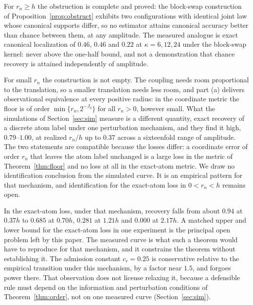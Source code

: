 \documentclass[11pt]{article}
\theoremstyle{definition}
\newcommand{\1}{\mathbf 1}\newcommand{\op}{\operatorname}
\begin{document}
For $r_n\ge h$ the obstruction is complete and proved: the block-swap
construction of Proposition~\ref{prop:obstruct} exhibits two configurations
with identical joint law whose canonical supports differ, so no estimator
attains canonical accuracy better than chance between them, at any amplitude.
The measured analogue is exact canonical localization of $0.46$, $0.46$ and
$0.22$ at $\kappa=6,12,24$ under the block-swap kernel: never above the
one-half bound, and not a demonstration that chance recovery is attained
independently of amplitude.

For small $r_n$ the construction is not empty.  The coupling needs room
proportional to the translation, so a smaller translation needs less room, and
part (a) delivers observational equivalence at every positive radius: in the
coordinate metric the floor is of order $\min\{r_n,2^{-J_0}\}$ for all $r_n>0$,
however small.  What the simulations of Section~\ref{sec:sim} measure is a
different quantity, exact recovery of a discrete atom label under one
perturbation mechanism, and they find it high, $0.79$--$1.00$, at realized
$r_n/h$ up to $0.37$ across a sixteenfold range of amplitude.  The two
statements are compatible because the losses differ: a coordinate error of
order $r_n$ that leaves the atom label unchanged is a large loss in the metric
of Theorem~\ref{thm:floor} and no loss at all in the exact-atom metric.  We
draw no identification conclusion from the simulated curve.  It is an empirical
pattern for that mechanism, and identification for the exact-atom
loss in $0<r_n<h$ remains open.

In the exact-atom loss, under that mechanism, recovery falls from about
$0.94$ at $0.37h$ to $0.685$ at $0.70h$, $0.281$ at $1.21h$ and $0.000$ at
$2.17h$.  A matched upper and lower bound for the exact-atom loss in one
experiment is the principal open problem left by this paper.  The measured
curve is what such a theorem would have to reproduce for that mechanism, and
it constrains the theorem without establishing it.  The admission constant $c_r=0.25$ is conservative relative to the empirical
transition under this mechanism, by a factor near $1.5$, and forgoes power
there.  That observation does not license relaxing it, because a defensible
rule must depend on the information and perturbation conditions of
Theorem~\ref{thm:order}, not on one measured curve (Section~\ref{sec:sim}).
\end{document}
